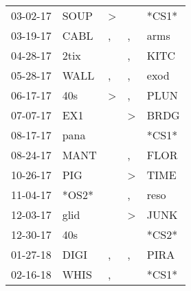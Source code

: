 \begin{supertabular}{p{0.07\textwidth}p{0.06\textwidth}p{0.02\textwidth}p{0.02\textwidth}p{0.06\textwidth}}
          03-02-17\textsuperscript{} &           SOUP\textsuperscript{} &     \textgreater &                  &                            *CS1* \\
          03-19-17\textsuperscript{} &           CABL\textsuperscript{} &                , &                , &           arms\textsuperscript{} \\
          04-28-17\textsuperscript{} &           2tix\textsuperscript{} &                  &                , &           KITC\textsuperscript{} \\
          05-28-17\textsuperscript{} &           WALL\textsuperscript{} &                , &                , &           exod\textsuperscript{} \\
          06-17-17\textsuperscript{} &            40s\textsuperscript{} &     \textgreater &                , &           PLUN\textsuperscript{} \\
          07-07-17\textsuperscript{} &            EX1\textsuperscript{} &                  &     \textgreater &           BRDG\textsuperscript{} \\
          08-17-17\textsuperscript{} &           pana\textsuperscript{} &                  &                  &                            *CS1* \\
          08-24-17\textsuperscript{} &           MANT\textsuperscript{} &                  &                , &           FLOR\textsuperscript{} \\
          10-26-17\textsuperscript{} &            PIG\textsuperscript{} &                  &     \textgreater &           TIME\textsuperscript{} \\
          11-04-17\textsuperscript{} &                            *OS2* &                  &                , &           reso\textsuperscript{} \\
          12-03-17\textsuperscript{} &           glid\textsuperscript{} &                  &     \textgreater &           JUNK\textsuperscript{} \\
          12-30-17\textsuperscript{} &            40s\textsuperscript{} &                  &                  &                            *CS2* \\
          01-27-18\textsuperscript{} &           DIGI\textsuperscript{} &                , &                , &           PIRA\textsuperscript{} \\
          02-16-18\textsuperscript{} &           WHIS\textsuperscript{} &                , &                  &                            *CS1* \\

\end{supertabular}
